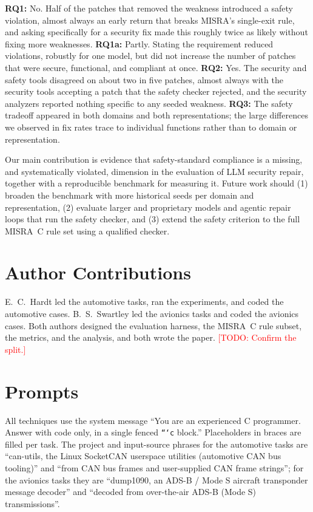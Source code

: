 \documentclass[12pt]{IEEEtran}
\newcommand{\todo}[1]{\textcolor{red}{[TODO: #1]}}
\begin{document}
\textbf{RQ1:} No. Half of the patches that removed the weakness introduced a safety violation, almost always an early return that breaks MISRA's single-exit rule, and asking specifically for a security fix made this roughly twice as likely without fixing more weaknesses. \textbf{RQ1a:} Partly. Stating the requirement reduced violations, robustly for one model, but did not increase the number of patches that were secure, functional, and compliant at once. \textbf{RQ2:} Yes. The security and safety tools disagreed on about two in five patches, almost always with the security tools accepting a patch that the safety checker rejected, and the security analyzers reported nothing specific to any seeded weakness. \textbf{RQ3:} The safety tradeoff appeared in both domains and both representations; the large differences we observed in fix rates trace to individual functions rather than to domain or representation.

Our main contribution is evidence that safety-standard compliance is a missing, and systematically violated, dimension in the evaluation of LLM security repair, together with a reproducible benchmark for measuring it. Future work should (1) broaden the benchmark with more historical seeds per domain and representation, (2) evaluate larger and proprietary models and agentic repair loops that run the safety checker, and (3) extend the safety criterion to the full MISRA~C rule set using a qualified checker.

\section*{Author Contributions}
E.~C.~Hardt led the automotive tasks, ran the experiments, and coded the automotive cases. B.~S.~Swartley led the avionics tasks and coded the avionics cases. Both authors designed the evaluation harness, the MISRA~C rule subset, the metrics, and the analysis, and both wrote the paper. \todo{Confirm the split.}

\appendices
\section{Prompts}
\label{app:prompts}
All techniques use the system message ``You are an experienced C programmer. Answer with code only, in a single fenced \texttt{```c} block.'' Placeholders in braces are filled per task. The project and input-source phrases for the automotive tasks are ``can-utils, the Linux SocketCAN userspace utilities (automotive CAN bus tooling)'' and ``from CAN bus frames and user-supplied CAN frame strings''; for the avionics tasks they are ``dump1090, an ADS-B / Mode S aircraft transponder message decoder'' and ``decoded from over-the-air ADS-B (Mode S) transmissions''.
\end{document}
